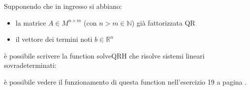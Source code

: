 \begin{flushleft}
Supponendo che in ingresso si abbiano:
\begin{itemize}
    \item la matrice $A\in M^{n\times m}$ (con $n>m\in \mathbb{N}$) già fattorizzata QR 
    \item il vettore dei termini noti $b \in \mathbb{R}^{n}$ 
\end{itemize}
è possibile scrivere la function solveQRH che risolve sistemi lineari sovradeterminati:
\newpage

è possibile vedere il funzionamento di questa function nell'esercizio 19 a pagina \pageref{es319}.
\end{flushleft}